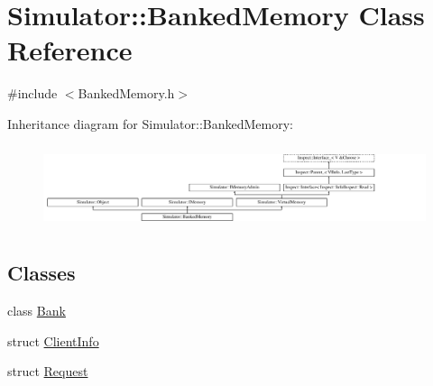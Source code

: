 \hypertarget{class_simulator_1_1_banked_memory}{\section{Simulator\+:\+:Banked\+Memory Class Reference}
\label{class_simulator_1_1_banked_memory}
}


{\ttfamily \#include $<$Banked\+Memory.\+h$>$}

Inheritance diagram for Simulator\+:\+:Banked\+Memory\+:\begin{figure}[H]
\begin{center}
\leavevmode
\includegraphics[height=2.456140cm]{class_simulator_1_1_banked_memory}
\end{center}
\end{figure}
\subsection*{Classes}
\begin{DoxyCompactItemize}
\item 
class \hyperlink{class_simulator_1_1_banked_memory_1_1_bank}{Bank}
\item 
struct \hyperlink{struct_simulator_1_1_banked_memory_1_1_client_info}{Client\+Info}
\item 
struct \hyperlink{struct_simulator_1_1_banked_memory_1_1_request}{Request}
\end{DoxyCompactItemize}
